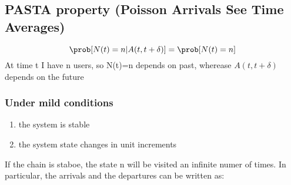 \subsection{PASTA property (Poisson Arrivals See Time Averages)}
\begin{equation}
  \prob[N(t)=n|A(t,t+\delta)] = \prob[N(t)=n]
\end{equation}
At time t I have n users, so N(t)=n depends on past, wherease $A(t,t+\delta)$ depends on the future

\subsubsection{Under mild conditions}
\begin{enumerate}
  \item the system is stable
  \item the system state changes in unit increments
\end{enumerate}
If the chain is staboe, the state n will be visited an infinite numer of times. In particular, the arrivals and the departures can be written as:
\begin{equation}\begin{split}

\end{split}\end{equation}
